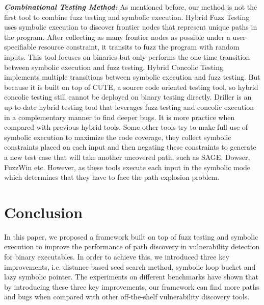 \documentclass[a4paper]{article}
\begin{document}
\noindent\textit{\textbf{Combinational Testing Method:}}
As mentioned before, our method is not the first tool to combine fuzz testing and symbolic execution. Hybrid Fuzz Testing uses symbolic execution to discover frontier nodes that represent unique paths in the program. After collecting as many frontier nodes as possible under a user-specifiable resource constraint, it transits to fuzz the program with random inputs. This tool focuses on binaries but only performs the one-time transition between symbolic execution and fuzz testing. Hybrid Concolic Testing implements multiple transitions between symbolic execution and fuzz testing. But because it is built on top of CUTE, a source code oriented testing tool, so hybrid concolic testing still cannot be deployed on binary testing directly. Driller is an up-to-date hybrid testing tool that leverages fuzz testing and concolic execution in a complementary manner to find deeper bugs. It is more practice when compared with previous hybrid tools. Some other tools try to make full use of symbolic execution to maximize the code coverage, they collect symbolic constraints placed on each input and then negating these constraints to generate a new test case that will take another uncovered path, such as SAGE, Dowser, FuzzWin etc. However, as these tools execute each input in the symbolic mode which determines that they have to face the path explosion problem. 

\section{Conclusion} \label{sec:conclusion}
In this paper, we proposed a framework built on top of fuzz testing and symbolic execution to improve the performance of path discovery in vulnerability detection for binary executables. In order to achieve this, we introduced three key improvements, i.e. distance based seed search method, symbolic loop bucket and lazy symbolic pointer. The experiments on different benchmarks have shown that by introducing these three key improvements, our framework can find more paths and bugs when compared with other off-the-shelf vulnerability discovery tools. 



\end{document}
